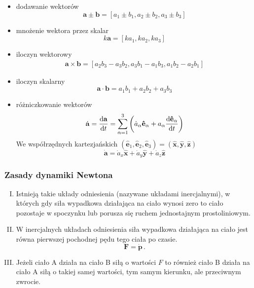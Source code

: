 \documentclass[../main.tex]{subfiles}
\begin{document}
\begin{itemize}
    \item dodawanie wektorów
    \begin{equation*}
        \mathbf{a}\pm\mathbf{b}=[a_1\pm b_1, a_2\pm b_2,a_3\pm b_3 ]
    \end{equation*}
    
    \item mnożenie wektora przez skalar
    \begin{equation*}
        k\mathbf{a}=[ka_1,ka_2,ka_3]
    \end{equation*}
    \item iloczyn wektorowy
    \begin{equation*}
    \begin{split}
       \mathbf{a}\times\mathbf{b}=[a_2b_3-a_3b_2,a_3b_1-a_1b_3,a_1b_2-a_2b_1]
    \end{split}
    \end{equation*}
    
    \item iloczyn skalarny
    \begin{equation*}
        \mathbf{a}\cdot\mathbf{b}=a_1b_1+a_2b_2+a_3b_3
    \end{equation*}
    \item różniczkowanie wektorów
    \begin{equation*}
        \dot{\mathbf{a}}=\dv{\mathbf{a}}{t}=\sum_{\alpha=1}^3\left(\dot a_\alpha\mathbf{\hat e}_\alpha+a_\alpha\dv{\mathbf{\hat e_\alpha}}{t}\right)
    \end{equation*}
    We współrzędnych kartezjańskich \((\mathbf{\hat e}_1,\mathbf{\hat e}_2,\mathbf{\hat e}_3)=(\mathbf{\hat x},\mathbf{\hat y},\mathbf{\hat z})\)
    \begin{equation*}
        \dot{\mathbf{a}}=\dot a_x\mathbf{\hat x}+\dot a_y\mathbf{\hat y}+\dot a_z\mathbf{\hat z}
    \end{equation*}
\end{itemize}
\subsubsection{Zasady dynamiki Newtona}
\begin{enumerate}[I.]
    \item Istnieją takie układy odniesienia (nazywane układami inercjalnymi), w których gdy siła wypadkowa działająca na ciało wynosi zero to ciało pozostaje w spoczynku lub porusza się ruchem jednostajnym prostoliniowym.
    \item W inercjalnych układach odniesienia siła wypadkowa działająca na ciało jest równa pierwszej pochodnej pędu tego ciała po czasie.
    \begin{equation*}
        \mathbf{F}=\dot{\mathbf{p}}\,.
    \end{equation*}
    \item Jeżeli ciało A działa na ciało B siłą o wartości \(F\) to również ciało B działa na ciało A siłą o takiej samej wartości, tym samym kierunku, ale przeciwnym zwrocie.
\end{enumerate}
\newpage
\end{document}
